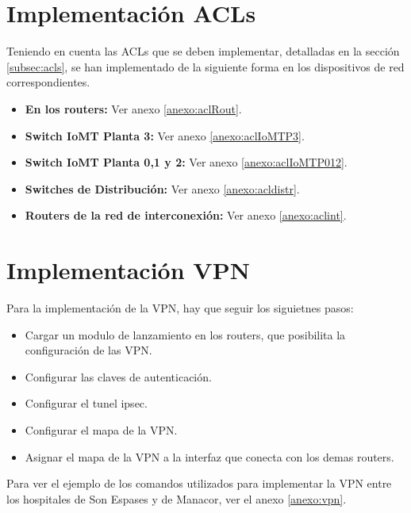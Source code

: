 \section{Implementación ACLs}
Teniendo en cuenta las ACLs que se deben implementar, detalladas en la sección \ref{subsec:acls}, se han implementado de la siguiente forma en los dispositivos de red correspondientes.
\begin{itemize}
    \item \textbf{En los routers:} Ver anexo \ref{anexo:aclRout}.
    \item \textbf{Switch IoMT Planta 3:} Ver anexo \ref{anexo:aclIoMTP3}.
    \item \textbf{Switch IoMT Planta 0,1 y 2:} Ver anexo \ref{anexo:aclIoMTP012}.
    \item \textbf{Switches de Distribución:} Ver anexo \ref{anexo:acldistr}.
    \item \textbf{Routers de la red de interconexión:} Ver anexo \ref{anexo:aclint}.
\end{itemize}

\section{Implementación VPN}
Para la implementación de la VPN, hay que seguir los siguietnes pasos:
\begin{itemize}
    \item Cargar un modulo de lanzamiento en los routers, que posibilita la configuración de las VPN.
    \item Configurar las claves de autenticación.
    \item Configurar el tunel ipsec.
    \item Configurar el mapa de la VPN.
    \item Asignar el mapa de la VPN a la interfaz que conecta con los demas routers.
\end{itemize}

Para ver el ejemplo de los comandos utilizados para implementar la VPN entre los hospitales de Son Espases y de Manacor, ver el anexo \ref{anexo:vpn}.